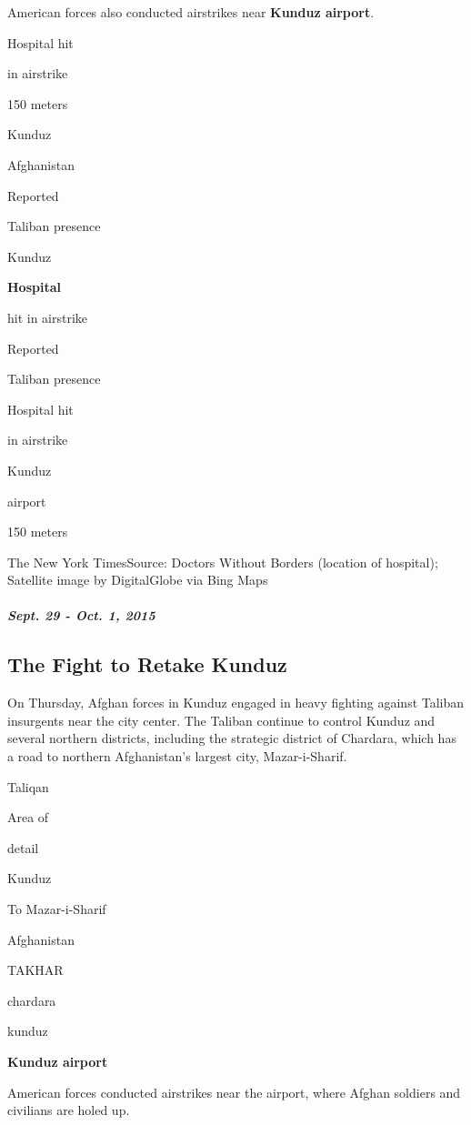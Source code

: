 American forces also conducted airstrikes near \textbf{Kunduz airport}.

Hospital hit

in airstrike

150 meters

Kunduz

Afghanistan

Reported

Taliban presence

Kunduz

\textbf{Hospital}

hit in airstrike

Reported

Taliban presence

Hospital hit

in airstrike

Kunduz

airport

150 meters

The New York Times\textbar{}Source: Doctors Without Borders (location of
hospital); Satellite image by DigitalGlobe via Bing Maps

\hypertarget{sept-29---oct-1-2015}{%
\subparagraph{Sept. 29 - Oct. 1, 2015}\label{sept-29---oct-1-2015}}

\hypertarget{the-fight-to-retake-kunduz}{%
\subsection{The Fight to Retake
Kunduz}\label{the-fight-to-retake-kunduz}}

On Thursday, Afghan forces in Kunduz engaged in heavy fighting against
Taliban insurgents near the city center. The Taliban continue to control
Kunduz and several northern districts, including the strategic district
of Chardara, which has a road to northern Afghanistan's largest city,
Mazar-i-Sharif.

Taliqan

Area of

detail

Kunduz

To Mazar-i-Sharif

Afghanistan

TAKHAR

chardara

kunduz

\textbf{Kunduz airport}

American forces conducted airstrikes near the airport, where Afghan
soldiers and civilians are holed up.

